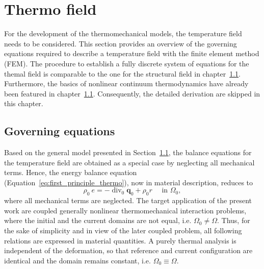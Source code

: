 \chapter{Thermo field}

For the development of the thermomechanical models, the temperature field needs to be considered.
This section provides an overview of the governing equations required to describe a temperature field with the finite element method (FEM).
The procedure to establish a fully discrete system of equations for the themal field is comparable to the one for the structural field in chapter~\ref{}.
Furthermore, the basics of nonlinear continuum thermodynamics have already been featured in chapter~\ref{}.
Consequently, the detailed derivation are skipped in this chapter.


\section{Governing equations}

Based on the general model presented in Section~\ref{}, the balance equations for the temperature field are obtained as a special case by neglecting all mechanical terms.
Hence, the energy balance equation (Equation~\eqref{eq:first_principle_thermo}), now in material description, reduces to
\begin{equation} \label{eq:strong_energy_eq}
\rho_0\ e=-\operatorname{div}_0 \bm q_0+\rho_0 r \quad \text { in } \Omega_0,
\end{equation}
where all mechanical terms are neglected.
The target application of the present work are coupled generally nonlinear thermomechanical interaction problems, where the initial and the current domains are not equal, i.e. \(\Omega_{0} \neq \Omega\).
Thus, for the sake of simplicity and in view of the later coupled problem, all following relations are expressed in material quantities.
A purely thermal analysis is independent of the deformation, so that reference and current configuration are identical and the domain remains constant, i.e. \(\Omega_{0} \equiv \Omega\).

